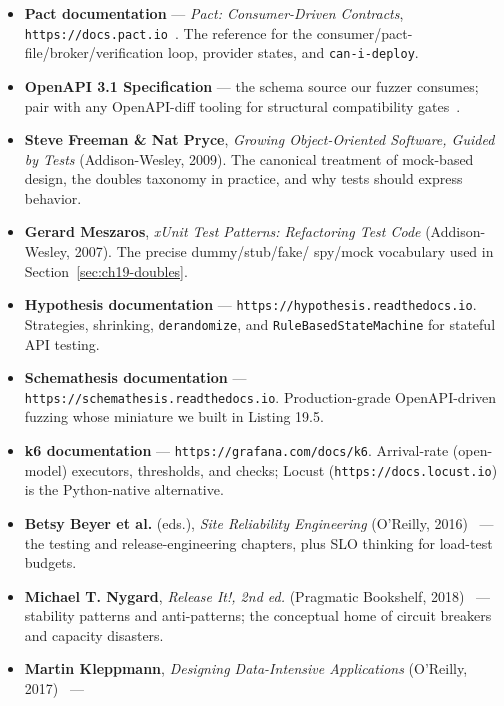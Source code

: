 \begin{itemize}
  \item \textbf{Pact documentation} --- \emph{Pact: Consumer-Driven
        Contracts}, \texttt{https://docs.pact.io}~\cite{pactdocs}. The
        reference for the consumer/pact-file/broker/verification loop,
        provider states, and \texttt{can-i-deploy}.
  \item \textbf{OpenAPI 3.1 Specification} --- the schema source our
        fuzzer consumes; pair with any OpenAPI-diff tooling for structural
        compatibility gates~\cite{openapi31}.
  \item \textbf{Steve Freeman \& Nat Pryce}, \emph{Growing
        Object-Oriented Software, Guided by Tests} (Addison-Wesley, 2009).
        The canonical treatment of mock-based design, the doubles
        taxonomy in practice, and why tests should express behavior.
  \item \textbf{Gerard Meszaros}, \emph{xUnit Test Patterns: Refactoring
        Test Code} (Addison-Wesley, 2007). The precise dummy/stub/fake/
        spy/mock vocabulary used in Section~\ref{sec:ch19-doubles}.
  \item \textbf{Hypothesis documentation} ---
        \texttt{https://hypothesis.readthedocs.io}. Strategies, shrinking,
        \texttt{derandomize}, and \texttt{RuleBasedStateMachine} for
        stateful API testing.
  \item \textbf{Schemathesis documentation} ---
        \texttt{https://schemathesis.readthedocs.io}. Production-grade
        OpenAPI-driven fuzzing whose miniature we built in Listing 19.5.
  \item \textbf{k6 documentation} --- \texttt{https://grafana.com/docs/k6}.
        Arrival-rate (open-model) executors, thresholds, and checks;
        Locust (\texttt{https://docs.locust.io}) is the Python-native
        alternative.
  \item \textbf{Betsy Beyer et al.} (eds.), \emph{Site Reliability
        Engineering} (O'Reilly, 2016)~\cite{beyer2016sre} --- the testing
        and release-engineering chapters, plus SLO thinking for load-test
        budgets.
  \item \textbf{Michael T. Nygard}, \emph{Release It!, 2nd ed.} (Pragmatic
        Bookshelf, 2018)~\cite{nygard2018releaseit} --- stability patterns
        and anti-patterns; the conceptual home of circuit breakers and
        capacity disasters.
  \item \textbf{Martin Kleppmann}, \emph{Designing Data-Intensive
        Applications} (O'Reilly, 2017)~\cite{kleppmann2017ddia} ---

\end{itemize}

